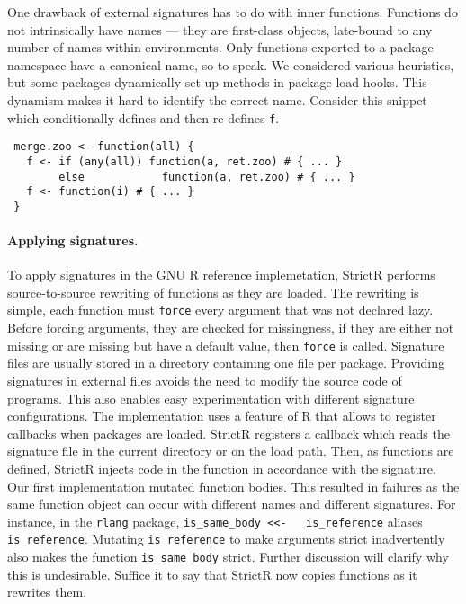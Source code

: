 \documentclass[review,nonacm,screen,acmsmall,anonymous=true]{acmart}
\newcommand{\code}[1]{\lstinline |#1|\xspace}
\renewcommand{\c}[1]{\lstinline |#1|\xspace}
\newcommand{\strictr}{{\sf StrictR}\xspace}
\begin{document}
One drawback of external signatures has to do with inner functions. Functions do
not intrinsically have names --- they are first-class objects, late-bound to any
number of names within environments. Only functions exported to a package
namespace have a canonical name, so to speak. We considered various heuristics,
but some packages dynamically set up methods in package load hooks. This dynamism
makes it hard to identify the correct name. Consider this snippet
which conditionally defines and then re-defines \c f.

\begin{lstlisting}
 merge.zoo <- function(all) {
   f <- if (any(all)) function(a, ret.zoo) # { ... }
        else            function(a, ret.zoo) # { ... }
   f <- function(i) # { ... }
 }
\end{lstlisting}

\paragraph{Applying signatures.}
To apply signatures in the GNU R reference implemetation, \strictr performs
source-to-source rewriting of functions as they are loaded. The rewriting is
simple, each function must \c{force} every argument that was not declared lazy.
Before forcing arguments, they are checked for missingness, if they are either
not missing or are missing but have a default value, then \c{force} is called.
Signature files are usually stored in a directory containing one file per package.
Providing signatures in external files avoids the need to modify the source code
of programs. This also enables easy experimentation with different signature
configurations. The implementation uses a feature of R that allows to register
callbacks when packages are loaded. \strictr registers a callback which reads
the signature file in the current directory or on the load path. Then, as
functions are defined, \strictr injects code in the function in accordance with
the signature.
Our first implementation mutated function bodies. This resulted in failures as
the same function object can occur with different names and different
signatures. For instance, in the \code{rlang} package, \code{is_same_body <<-
  is_reference} aliases \code{is_reference}. Mutating \code{is_reference} to
make arguments strict inadvertently also makes the function \code{is_same_body}
strict. Further discussion will clarify why this is undesirable. Suffice it to
say that \strictr now copies functions as it rewrites them.
\end{document}
